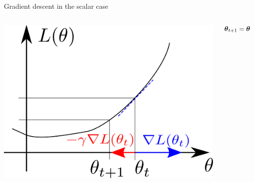 \documentclass[xcolor=pdftex,dvipsnames,table,mathserif]{beamer}
\begin{document}
\begin{frame}{Gradient descent in the scalar case}

  \begin{columns}
    \begin{column}{.5\textwidth}
      \includegraphics[width=\textwidth]{gradient_descent}
    \end{column}

    \begin{column}{.5\textwidth}
      \[
      \boldsymbol{\theta}_{t+1} = \boldsymbol{\theta}_t - \eta\nabla L(\boldsymbol{\theta}_t)
      \]
    \end{column}
  \end{columns}

\end{frame}
\end{document}
